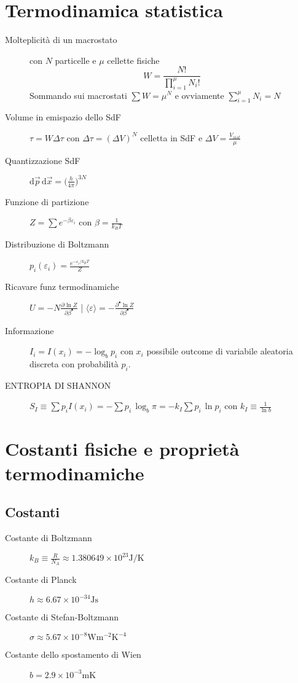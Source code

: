 \documentclass[10pt, oneside]{article}
\begin{document}
\section{Termodinamica statistica}
\begin{description}
\item[Molteplicità di un macrostato] con $N$ particelle e $\mu$ cellette fisiche
\[W = \frac{N!}{\displaystyle \prod_{i=1}^\mu N_i!}\]
Sommando sui macrostati $\displaystyle \sum W = \mu^N$ e ovviamente $\displaystyle \sum\limits_{i=1}^\mu N_i = N$
\item[Volume in emispazio dello SdF] $\displaystyle \tau = W \Delta \tau$ con $\Delta \tau = (\Delta V)^N$ celletta in SdF e $\displaystyle \Delta V = \frac{V_{sist}}{\mu}$
\item[Quantizzazione SdF] $\displaystyle \mathrm{d}\vec{p} \, \mathrm{d}\vec{x} = \big(\frac{h}{4\pi}\big)^{3N}$
\end{description}
\begin{description}
\item[Funzione di partizione] $\displaystyle Z = \sum e^{- \beta \varepsilon_i}$ con $\displaystyle \beta = \frac{1}{k_B T}$
\item[Distribuzione di Boltzmann] $\displaystyle p_i(\varepsilon_i) = \frac{e^{-\varepsilon_i/k_B T}}{Z}$
\item[Ricavare funz termodinamiche] $\displaystyle U = - N \frac{\partial^{} \ln Z}{\partial \beta^{•}}$ \bigg| $\displaystyle \langle \varepsilon \rangle = - \frac{\partial^{•} \ln Z}{\partial \beta^{•}}$
\item[Informazione] $\displaystyle I_i = I(x_i) = - \log_b p_i$ con $x_i$ possibile outcome di variabile aleatoria discreta con probabilità $p_i$.
\item[\large ENTROPIA DI SHANNON] $\displaystyle S_I \equiv \sum p_i I(x_i) = - \sum p_i \, \log_b \pi = - k_I \sum p_i \, \ln p_i$ con $\displaystyle k_I \equiv \frac{1}{\ln b}$
\end{description}

\section{Costanti fisiche e proprietà termodinamiche}
\subsection{Costanti}
\begin{description}
\item[Costante di Boltzmann] $\displaystyle k_B \equiv \frac{R}{N_A} \approx 1.380649 \times 10^{23} \mathrm{J/K}$ 
\item[Costante di Planck] $\displaystyle h \approx 6.67 \times 10^{-34} \mathrm{Js}$
\item[Costante di Stefan-Boltzmann] $\displaystyle \sigma \approx 5.67 \times 10^{-8} \mathrm{W m^{-2} K^{-4}}$
\item[Costante dello spostamento di Wien] $\displaystyle b = 2.9 \times 10^{-3} \mathrm{m K}$
\end{description}
\end{document}
